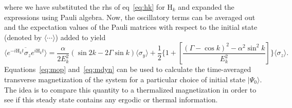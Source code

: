 \documentclass[a4paper,10pt]{article}
\begin{document}
where we have substituted the rhs of eq~\ref{eq:hk} for $\mathrm{H}_k$ and expanded the expressions using Pauli algebra. Now, the oscillatory terms can be averaged out and the expectation values of the Pauli matrices with respect to the initial state (denoted by $\langle\cdots\rangle$) added to yield
\begin{equation}
\label{eq:mop}
\langle\overline{e^{-i\mathrm{H}_k t}\sigma_z e^{i\mathrm{H}_k t}}\rangle =\frac{\alpha}{2E^2_k}\left(\sin{2k}-2\Gamma\sin{k}\right)\langle\sigma_y\rangle+\frac{1}{2}\bigg\{1+\left[\frac{\left(\Gamma-\cos{k}\right)^2-\alpha^2\sin^2{k}}{E^2_k}\right]\bigg\}\langle\sigma_z\rangle.
\end{equation}
Equations~\ref{eq:mop} and~\ref{eq:mdyn} can be used to calculate the time-averaged transverse magnetization of the system for a particular choice of initial state $|\Psi_0\rangle$. The idea is to compare this quantity to a thermalized magnetization in order to see if this steady state contains any ergodic or thermal information. 
\end{document}
